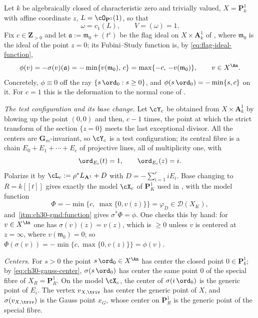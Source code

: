 \begin{example}
\label{ex:ch30-gauss-normal-cone}
Let \(k\) be algebraically closed of characteristic zero and trivially
valued, \(X=\mathbf P^1_k\) with affine coordinate \(z\),
\(L=\cO_{\mathbf P^1}(1)\), so that
\[
                       \omega=c_1(L),\qquad V=(\omega)=1 .
\]
Fix \(c\in\mathbf Z_{>0}\) and let \(\mathfrak a:=\mathfrak m_0+(t^c)\) be
the flag ideal on \(X\times\mathbf A^1_k\) of
, where \(\mathfrak m_0\) is the ideal of the point
\(z=0\); its Fubini--Study function is, by
\eqref{eq:flag-ideal-function},
\begin{equation}
\label{eq:ch30-gauss-example-phi}
 \phi(v)=-\sigma(v)(\mathfrak a)
        =-\min\{v(\mathfrak m_0),\,c\}
        =\max\{-c,\,-v(\mathfrak m_0)\},
 \qquad v\in X^{\An}.
\end{equation}
Concretely, \(\phi\equiv0\) off the ray \(\{s\,\ord_0:s\geq0\}\), and
\(\phi(s\,\ord_0)=-\min\{s,c\}\) on it.  For \(c=1\) this is the
deformation to the normal cone of .

\emph{The test configuration and its base change.}  Let \(\cY_c\) be
obtained from \(X\times\mathbf A^1_k\) by blowing up the point \((0,0)\)
and then, \(c-1\) times, the point at which the strict transform of the
section \(\{z=0\}\) meets the last exceptional divisor.  All the centers
are \(\mathbf G_m\)-invariant, so \(\cY_c\) is a test configuration; its
central fibre is a chain \(E_0+E_1+\cdots+E_c\) of projective lines, all of
multiplicity one, with
\[
 \ord_{E_i}(t)=1,\qquad \ord_{E_i}(z)=i .
\]
Polarize it by \(\cL_c:=\rho^*L_{\mathbf A^1}+D\) with
\(D=-\sum_{i=1}^ciE_i\).  Base changing to \(R=k[\![t]\!]\) gives exactly
the model \(\cX_c\) of \(\mathbf P^1_K\) used in
, with the model function
\begin{equation}
\label{eq:ch30-gauss-example-Phi}
 \Phi=-\min\bigl\{c,\ \max\{0,v(z)\}\bigr\}
 =\varphi_D\in\mathcal D(X_K),
\end{equation}
and \,\cref{itm:ch30-gmd:function}
gives \(\sigma^*\Phi=\phi\).  One checks this by hand: for
\(v\in X^{\An}\) one has \(\sigma(v)(z)=v(z)\), which is \(\geq0\) unless
\(v\) is centered at \(z=\infty\), where \(v(\mathfrak m_0)=0\); so
\(\Phi(\sigma(v))=-\min\{c,\max\{0,v(z)\}\}=\phi(v)\).

\emph{Centers.}  For \(s>0\) the point \(s\,\ord_0\in X^{\An}\) has center
the closed point \(0\in\mathbf P^1_k\); by
\eqref{eq:ch30-gauss-center}, \(\sigma(s\,\ord_0)\) has center the same
point \(0\) of the special fibre of \(X_R=\mathbf P^1_R\).  On the model
\(\cX_c\), the center of \(\sigma(i\,\ord_0)\) is the generic point of
\(E_i\).  The vertex \(v_{X,\triv}\) has center the generic point of \(X\),
and \(\sigma(v_{X,\triv})\) is the Gauss point \(x_G\), whose center on
\(\mathbf P^1_R\) is the generic point of the special fibre.


\end{example}
